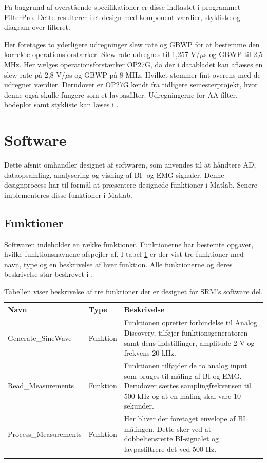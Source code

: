 På baggrund af overstående specifikationer er disse indtastet i programmet FilterPro. Dette resulterer i et design med komponent værdier, stykliste og diagram over filteret. 

Her foretages to yderligere udregninger slew rate og GBWP for at bestemme den korrekte operationsforstærker. Slew rate udregnes til 1,257 V/$\mu$s og GBWP til 2,5 MHz. Her vælges operationsforstærker OP27G, da der i databladet kan aflæses en slew rate på 2,8 V/$\mu$s og GBWP på 8 MHz. Hvilket stemmer fint overens med de udregnet værdier. Derudover er OP27G kendt fra tidligere semesterprojekt, hvor denne også skulle fungere som et lavpasfilter. Udregningerne for AA filter, bodeplot samt stykliste kan læses i .

\pagebreak

\section{Software}

Dette afsnit omhandler designet af softwaren, som anvendes til at håndtere AD, dataopsamling, analysering og visning af BI- og EMG-signaler. Denne designprocess har til formål at præsentere designede funktioner  i Matlab. Senere implementeres disse funktioner i Matlab.


\subsection{Funktioner}
Softwaren indeholder en række funktioner. Funktionerne har bestemte opgaver, hvilke funktionsnavnene afspejler af. I tabel \ref{tab:funktioner} er der vist tre funktioner med navn, type og en beskrivelse af hver funktion. Alle funktionerne og deres beskrivelse står beskrevet i . 

\begin{table}[H]

\begin{tabularx}{\textwidth}{l l X}
     Navn	&	Type		&	Beskrivelse \\ \midrule
     Generate\_SineWave	&	Funktion	&	Funktionen opretter forbindelse til Analog Discovery, tilføjer funktionsgeneratoren samt dens indstillinger, amplitude 2 V og frekvens 20 kHz.\\   \addlinespace[2mm]
     Read\_Measurements	&	Funktion	&	Funktionen tilføjder de to analog input som bruges til måling af BI og EMG. Derudover sættes samplingfrekvensen til 500 kHz og at en måling skal vare 10 sekunder.\\   \addlinespace[2mm]
     Process\_Measurements	&	Funktion	&	Her bliver der foretaget envelope af BI målingen. Dette sker ved at dobbeltensrette BI-signalet og lavpasfiltrere det ved 500 Hz.   \\   \addlinespace[2mm]
     \bottomrule                                                                                                                   
    \end{tabularx}
    \caption {Tabellen viser beskrivelse af tre funktioner der er designet for SRM's software del.}
    \label{tab:funktioner}
	
\end{table}

